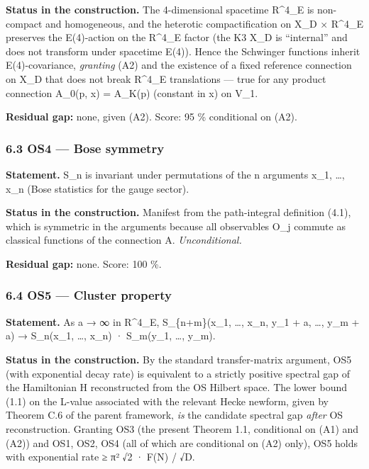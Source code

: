 \documentclass[
 11pt,
 a4paper,
]{article}
\begin{document}
\textbf{Status in the construction.} The 4-dimensional spacetime R\^{}4\_E is non-compact and homogeneous, and the heterotic compactification on X\_D × R\^{}4\_E preserves the E(4)-action on the R\^{}4\_E factor (the K3 X\_D is ``internal'' and does not transform under spacetime E(4)). Hence the Schwinger functions inherit E(4)-covariance, \emph{granting} (A2) and the existence of a fixed reference connection on X\_D that does not break R\^{}4\_E translations --- true for any product connection A\_0(p, x) = A\_K(p) (constant in x) on V\_1.

\textbf{Residual gap:} none, given (A2). Score: 95 \% conditional on (A2).

\hypertarget{os4-bose-symmetry}{%
\subsubsection{6.3 OS4 --- Bose symmetry}\label{os4-bose-symmetry}}

\textbf{Statement.} S\_n is invariant under permutations of the n arguments x\_1, \ldots, x\_n (Bose statistics for the gauge sector).

\textbf{Status in the construction.} Manifest from the path-integral definition (4.1), which is symmetric in the arguments because all observables O\_j commute as classical functions of the connection A. \emph{Unconditional.}

\textbf{Residual gap:} none. Score: 100 \%.

\hypertarget{os5-cluster-property}{%
\subsubsection{6.4 OS5 --- Cluster property}\label{os5-cluster-property}}

\textbf{Statement.} As \textbar a\textbar{} → ∞ in R\^{}4\_E, S\_\{n+m\}(x\_1, \ldots, x\_n, y\_1 + a, \ldots, y\_m + a) → S\_n(x\_1, \ldots, x\_n) · S\_m(y\_1, \ldots, y\_m).

\textbf{Status in the construction.} By the standard transfer-matrix argument, OS5 (with exponential decay rate) is equivalent to a strictly positive spectral gap of the Hamiltonian H reconstructed from the OS Hilbert space. The lower bound (1.1) on the L-value associated with the relevant Hecke newform, given by Theorem C.6 of the parent framework, \emph{is} the candidate spectral gap \emph{after} OS reconstruction. Granting OS3 (the present Theorem 1.1, conditional on (A1) and (A2)) and OS1, OS2, OS4 (all of which are conditional on (A2) only), OS5 holds with exponential rate ≥ π² √2 · F(N) / √\textbar D\textbar.
\end{document}
